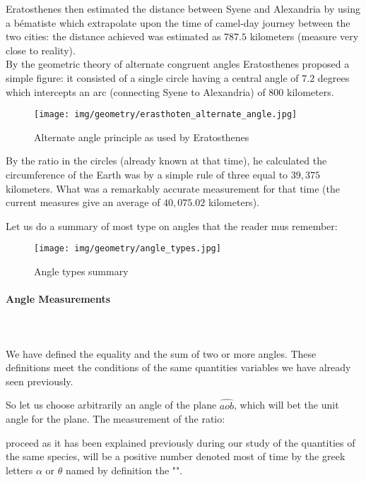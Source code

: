 \begin{enumerate}
\begin{tcolorbox}[colframe=black,colback=white,sharp corners]
		Eratosthenes then estimated the distance between Syene and Alexandria by using a bématiste which extrapolate upon the time of camel-day journey between the two cities: the distance achieved was estimated as $787.5$ kilometers (measure very close to reality).\\
		
		By the geometric theory of alternate congruent angles  Eratosthenes proposed a simple figure: it consisted of a single circle having a central angle of $7.2$ degrees which intercepts an arc (connecting Syene to Alexandria) of $800$ kilometers.
		\begin{figure}[H]
			\centering
			\texttt{[image: img/geometry/erasthoten\_alternate\_angle.jpg]}
			\caption{Alternate angle principle as used by Eratosthenes}
		\end{figure}
		By the ratio in the circles (already known at that time), he calculated the circumference of the Earth was by a simple rule of three equal to $39,375$ kilometers. What was a remarkably accurate measurement for that time (the current measures give an average of $40,075.02$ kilometers).
		\end{tcolorbox}
	\end{enumerate}
	
	Let us do a summary of most type on angles that the reader mus remember:
	\begin{figure}[H]
		\centering
		\texttt{[image: img/geometry/angle\_types.jpg]}
		\caption{Angle types summary}
	\end{figure}
	
	\pagebreak
	\paragraph{Angle Measurements}\mbox{}\\\\
	We have defined the equality and the sum of two or more angles. These definitions meet the conditions of the same quantities variables we have already seen previously.

	So let us choose arbitrarily an angle of the plane $\widehat{aob}$, which will bet the unit angle for the plane. The measurement of the ratio:
	
	proceed as it has been explained previously during our study of the quantities of the same species, will be a positive number denoted most of time by the greek letters $\alpha$ or $\theta$ named by definition the "".
	
